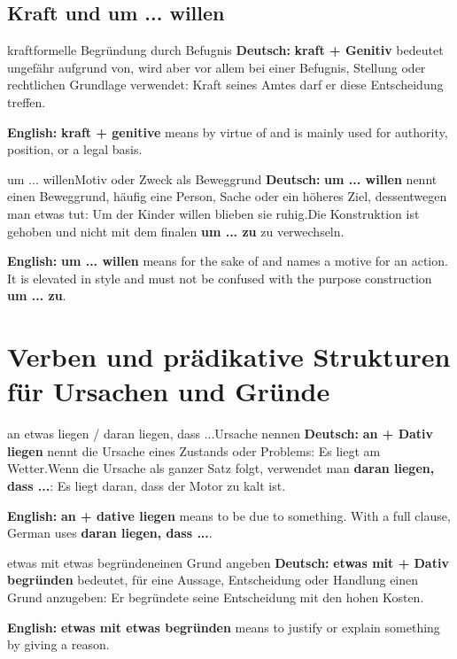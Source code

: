 \documentclass[a4paper,11pt]{article}
\newcommand{\GermanText}[1]{\textbf{Deutsch: }#1\par}
\newcommand{\EnglishText}[1]{{\small\color{SoftGray}\textbf{English: }#1\par}}
\begin{document}
        \subsection{Kraft und um ... willen}

            \begin{grammarentry}{kraft}{formelle Begründung durch Befugnis}
                \GermanText{\textbf{kraft + Genitiv} bedeutet ungefähr \glqq aufgrund von\grqq, wird aber vor allem bei einer Befugnis, Stellung oder rechtlichen Grundlage verwendet: \glqq Kraft seines Amtes darf er diese Entscheidung treffen.\grqq}
                \EnglishText{\textbf{kraft + genitive} means by virtue of and is mainly used for authority, position, or a legal basis.}
            \end{grammarentry}

            \begin{grammarentry}{um ... willen}{Motiv oder Zweck als Beweggrund}
                \GermanText{\textbf{um ... willen} nennt einen Beweggrund, häufig eine Person, Sache oder ein höheres Ziel, dessentwegen man etwas tut: \glqq Um der Kinder willen blieben sie ruhig.\grqq Die Konstruktion ist gehoben und nicht mit dem finalen \textbf{um ... zu} zu verwechseln.}
                \EnglishText{\textbf{um ... willen} means for the sake of and names a motive for an action. It is elevated in style and must not be confused with the purpose construction \textbf{um ... zu}.}
            \end{grammarentry}

    \section{Verben und prädikative Strukturen für Ursachen und Gründe}

        \begin{grammarentry}{an etwas liegen / daran liegen, dass ...}{Ursache nennen}
            \GermanText{\textbf{an + Dativ liegen} nennt die Ursache eines Zustands oder Problems: \glqq Es liegt am Wetter.\grqq Wenn die Ursache als ganzer Satz folgt, verwendet man \textbf{daran liegen, dass ...}: \glqq Es liegt daran, dass der Motor zu kalt ist.\grqq}
            \EnglishText{\textbf{an + dative liegen} means to be due to something. With a full clause, German uses \textbf{daran liegen, dass ...}.}
        \end{grammarentry}

        \begin{grammarentry}{etwas mit etwas begründen}{einen Grund angeben}
            \GermanText{\textbf{etwas mit + Dativ begründen} bedeutet, für eine Aussage, Entscheidung oder Handlung einen Grund anzugeben: \glqq Er begründete seine Entscheidung mit den hohen Kosten.\grqq}
            \EnglishText{\textbf{etwas mit etwas begründen} means to justify or explain something by giving a reason.}
        \end{grammarentry}
\end{document}
